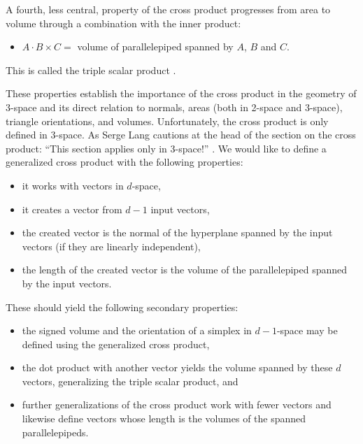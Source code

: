 \documentclass[10pt]{article}
\begin{document}
A fourth, less central, property of the cross product progresses from area to volume through 
a combination with the inner product:
\begin{itemize}
\item $A \cdot B \times C =$ volume of parallelepiped spanned by $A$, $B$ and $C$.
\end{itemize}
This is called the triple scalar product \cite{wrede72}.

These properties establish the importance of the cross product in the geometry of 3-space
and its direct relation to normals, areas (both in 2-space and 3-space),
triangle orientations, and volumes.
%
Unfortunately, the cross product is only defined in 3-space.
As Serge Lang cautions at the head of the section on the cross product:
``This section applies only in 3-space!'' \cite{lang71}. %
We would like to define a generalized cross product with the following properties:
\begin{itemize}
\item it works with vectors in $d$-space,
\item it creates a vector from $d-1$ input vectors,
\item the created vector is the normal of the hyperplane spanned by the input vectors
      (if they are linearly independent),
\item the length of the created vector is the volume of the parallelepiped spanned by the
      input vectors.
\end{itemize}
These should yield the following secondary properties:
\begin{itemize}
\item the signed volume and the orientation of a simplex in $d-1$-space may be defined 
  using the generalized cross product,
\item the dot product with another vector yields the volume spanned by these $d$ vectors,
      generalizing the triple scalar product, and
\item further generalizations of the cross product work with fewer vectors and likewise
      define vectors whose length is the volumes of the spanned parallelepipeds.
\end{itemize}

\end{document}
